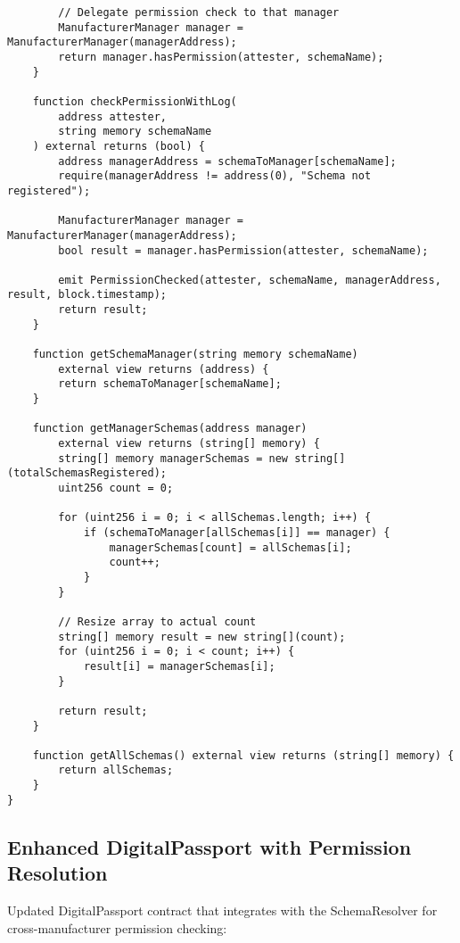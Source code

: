\documentclass[11pt,a4paper]{article}
\begin{document}
\begin{verbatim}
        // Delegate permission check to that manager
        ManufacturerManager manager = ManufacturerManager(managerAddress);
        return manager.hasPermission(attester, schemaName);
    }
    
    function checkPermissionWithLog(
        address attester,
        string memory schemaName
    ) external returns (bool) {
        address managerAddress = schemaToManager[schemaName];
        require(managerAddress != address(0), "Schema not registered");
        
        ManufacturerManager manager = ManufacturerManager(managerAddress);
        bool result = manager.hasPermission(attester, schemaName);
        
        emit PermissionChecked(attester, schemaName, managerAddress, result, block.timestamp);
        return result;
    }
    
    function getSchemaManager(string memory schemaName) 
        external view returns (address) {
        return schemaToManager[schemaName];
    }
    
    function getManagerSchemas(address manager) 
        external view returns (string[] memory) {
        string[] memory managerSchemas = new string[](totalSchemasRegistered);
        uint256 count = 0;
        
        for (uint256 i = 0; i < allSchemas.length; i++) {
            if (schemaToManager[allSchemas[i]] == manager) {
                managerSchemas[count] = allSchemas[i];
                count++;
            }
        }
        
        // Resize array to actual count
        string[] memory result = new string[](count);
        for (uint256 i = 0; i < count; i++) {
            result[i] = managerSchemas[i];
        }
        
        return result;
    }
    
    function getAllSchemas() external view returns (string[] memory) {
        return allSchemas;
    }
}
\end{verbatim}

\subsection{Enhanced DigitalPassport with Permission Resolution}

Updated DigitalPassport contract that integrates with the SchemaResolver for cross-manufacturer permission checking:
\end{document}

